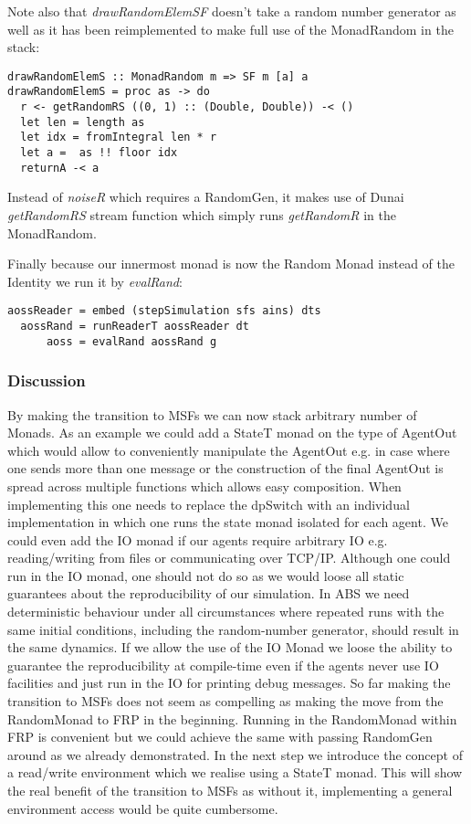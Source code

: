 Note also that \textit{drawRandomElemSF} doesn't take a random number generator as well as it has been reimplemented to make full use of the MonadRandom in the stack:

\begin{verbatim}
drawRandomElemS :: MonadRandom m => SF m [a] a
drawRandomElemS = proc as -> do
  r <- getRandomRS ((0, 1) :: (Double, Double)) -< ()
  let len = length as
  let idx = fromIntegral len * r
  let a =  as !! floor idx
  returnA -< a
\end{verbatim}

Instead of \textit{noiseR} which requires a RandomGen, it makes use of Dunai \textit{getRandomRS} stream function which simply runs \textit{getRandomR} in the MonadRandom.

Finally because our innermost monad is now the Random Monad instead of the Identity we run it by \textit{evalRand}:

\begin{verbatim}
aossReader = embed (stepSimulation sfs ains) dts
  aossRand = runReaderT aossReader dt
      aoss = evalRand aossRand g
\end{verbatim}

\subsubsection{Discussion}
By making the transition to MSFs we can now stack arbitrary number of Monads. As an example we could add a StateT monad on the type of AgentOut which would allow to conveniently manipulate the AgentOut e.g. in case where one sends more than one message or the construction of the final AgentOut is spread across multiple functions which allows easy composition. When implementing this one needs to replace the dpSwitch with an individual implementation in which one runs the state monad isolated for each agent.
We could even add the IO monad if our agents require arbitrary IO e.g. reading/writing from files or communicating over TCP/IP. Although one could run in the IO monad, one should not do so as we would loose all static guarantees about the reproducibility of our simulation. In ABS we need deterministic behaviour under all circumstances where repeated runs with the same initial conditions, including the random-number generator, should result in the same dynamics. If we allow the use of the IO Monad we loose the ability to guarantee the reproducibility at compile-time even if the agents never use IO facilities and just run in the IO for printing debug messages.
So far making the transition to MSFs does not seem as compelling as making the move from the RandomMonad to FRP in the beginning. Running in the RandomMonad within FRP is convenient but we could achieve the same with passing RandomGen around as we already demonstrated. In the next step we introduce the concept of a read/write environment which we realise using a StateT monad. This will show the real benefit of the transition to MSFs as without it, implementing a general environment access would be quite cumbersome.